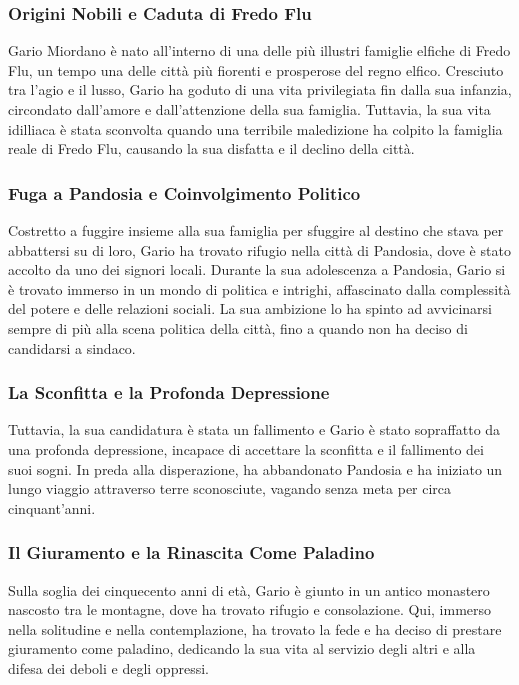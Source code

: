 \subsubsection{Origini Nobili e Caduta di Fredo Flu}
Gario Miordano è nato all'interno di una delle più illustri famiglie
elfiche di Fredo Flu, un tempo una delle città più fiorenti e prosperose
del regno elfico. Cresciuto tra l'agio e il lusso, Gario ha goduto di
una vita privilegiata fin dalla sua infanzia, circondato dall'amore e
dall'attenzione della sua famiglia. Tuttavia, la sua vita idilliaca è
stata sconvolta quando una terribile maledizione ha colpito la famiglia
reale di Fredo Flu, causando la sua disfatta e il declino della città.

\subsubsection{Fuga a Pandosia e Coinvolgimento Politico}
Costretto a fuggire insieme alla sua famiglia per sfuggire al destino
che stava per abbattersi su di loro, Gario ha trovato rifugio nella
città di Pandosia, dove è stato accolto da uno dei signori locali.
Durante la sua adolescenza a Pandosia, Gario si è trovato immerso in un
mondo di politica e intrighi, affascinato dalla complessità del potere e
delle relazioni sociali. La sua ambizione lo ha spinto ad avvicinarsi
sempre di più alla scena politica della città, fino a quando non ha
deciso di candidarsi a sindaco.

\subsubsection{La Sconfitta e la Profonda Depressione}
Tuttavia, la sua candidatura è stata un fallimento e Gario è stato
sopraffatto da una profonda depressione, incapace di accettare la
sconfitta e il fallimento dei suoi sogni. In preda alla disperazione, ha
abbandonato Pandosia e ha iniziato un lungo viaggio attraverso terre
sconosciute, vagando senza meta per circa cinquant'anni.

\subsubsection{Il Giuramento e la Rinascita Come Paladino}
Sulla soglia dei cinquecento anni di età, Gario è giunto in un antico
monastero nascosto tra le montagne, dove ha trovato rifugio e
consolazione. Qui, immerso nella solitudine e nella contemplazione, ha
trovato la fede e ha deciso di prestare giuramento come paladino,
dedicando la sua vita al servizio degli altri e alla difesa dei deboli e
degli oppressi.

